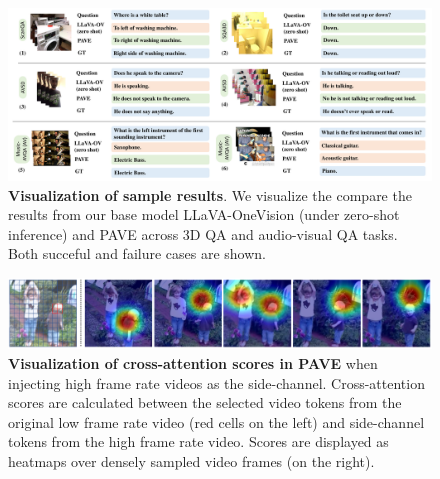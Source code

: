 \begin{figure}[t!]
    \centering
    \includegraphics[width=0.92\linewidth]{figures/qa_visualization_updated2.pdf}
    \vspace{-1em}
    \caption{\textbf{Visualization of sample results}. We visualize the compare the results from our base model LLaVA-OneVision (under zero-shot inference) and PAVE across 3D QA and audio-visual QA tasks. Both succeful and failure cases are shown. 
    }
    \label{fig:qa_visualization}
    \vspace{-0.5em}
\end{figure}


\begin{figure}[t!]
    \centering
    \includegraphics[width=0.90\linewidth]{figures/cross_attention_visualization.pdf}
    \vspace{-0.5em}
    \caption{\textbf{Visualization of cross-attention scores in PAVE} when injecting high frame rate videos as the side-channel. Cross-attention scores are calculated between the selected video tokens from the original low frame rate video (red cells on the left) and side-channel tokens from the high frame rate video. Scores are displayed as heatmaps over densely sampled video frames (on the right).} %
    \label{fig:cross_attention}
    \vspace{-1.5em}
\end{figure}

